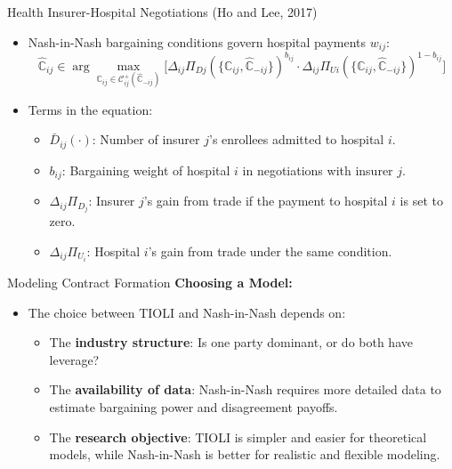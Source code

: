 \documentclass[aspectratio=169]{beamer}  %
\begin{document}
\begin{frame}{Health Insurer-Hospital Negotiations (Ho and Lee, 2017)}
    \begin{itemize}
        \item Nash-in-Nash bargaining conditions govern hospital payments \(w_{ij}\):
        \[
            \widehat{\mathbb{C}}_{ij} \in \arg \max_{\mathbb{C}_{ij} \in \mathcal{C}_{ij}^+(\widehat{\mathbb{C}}_{-ij})}  
            \Bigg[
            {\Delta_{ij} \Pi_{Dj}(\{\mathbb{C}_{ij}, \widehat{\mathbb{C}}_{-ij}\})}^{b_{ij}}
            \cdot
            {\Delta_{ij} \Pi_{Ui}(\{\mathbb{C}_{ij}, \widehat{\mathbb{C}}_{-ij}\})}^{1-b_{ij}}
            \Bigg]
            \]
        \item Terms in the equation:
        \begin{itemize}
            \item \(\bar{D}_{ij}(\cdot)\): Number of insurer \(j\)'s enrollees admitted to hospital \(i\).
            \item \(b_{ij}\): Bargaining weight of hospital \(i\) in negotiations with insurer \(j\).
            \item \(\Delta_{ij} \Pi_{D_j}\): Insurer \(j\)'s gain from trade if the payment to hospital \(i\) is set to zero.
            \item \(\Delta_{ij} \Pi_{U_i}\): Hospital \(i\)'s gain from trade under the same condition.
        \end{itemize}
    \end{itemize}
\end{frame}

 
    \begin{frame}{Modeling Contract Formation}
        \textbf{Choosing a Model:}
        \begin{itemize}
            \item The choice between TIOLI and Nash-in-Nash depends on:
            \begin{itemize}
                \item The \textbf{industry structure}: Is one party dominant, or do both have leverage?
                \item The \textbf{availability of data}: Nash-in-Nash requires more detailed data to estimate bargaining power and disagreement payoffs.
                \item The \textbf{research objective}: TIOLI is simpler and easier for theoretical models, while Nash-in-Nash is better for realistic and flexible modeling.
            \end{itemize}
        \end{itemize}
        \end{frame}
    
\end{document}
